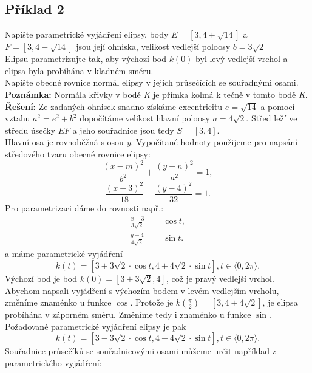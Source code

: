 		\subsection*{Příklad 2}
		Napište parametrické vyjádření elipsy, body $E=[3,4+\sqrt{14}]$ a $F=[3,4-\sqrt{14}]$ jsou její ohniska,
		velikost vedlejší poloosy $b=3\sqrt{2}$ \\
		Elipsu parametrizujte tak, aby výchozí bod $k(0)$ byl levý vedlejší vrchol a elipsa byla probíhána v kladném směru. \\
		Napište obecné rovnice normál elipsy v jejich průsečících se souřadnými osami. \\
		\textbf{Poznámka:} Normála křivky v bodě \textit{K} je přímka kolmá k tečně v tomto bodě \textit{K}. \\[10pt]
		\textbf{Řešení:} Ze zadaných ohnisek snadno získáme excentricitu $e=\sqrt{14}$ a pomocí vztahu $a^2=e^2+b^2$
		dopočítáme velikost hlavní poloosy $a=4\sqrt{2}$. Střed leží ve středu úsečky $EF$ a jeho souřadnice jsou tedy $S=[3,4]$.\\
		Hlavní osa je rovnoběžná s osou \textit{y}. Vypočítané hodnoty použijeme
		pro napsání středového tvaru obecné rovnice elipsy:
		$$\frac{(x-m)^2}{b^2}+\frac{(y-n)^2}{a^2}=1,$$
		$$\frac{(x-3)^2}{18}+\frac{(y-4)^2}{32}=1.$$
		Pro parametrizaci dáme do rovnosti např.:
		\begin{align*}
			\frac{x-3}{3\sqrt{2}} & = \cos{t}, \\
			\frac{y-4}{4\sqrt{2}} & = \sin{t}. 
		\end{align*}
		a máme parametrické vyjádření
		$$k(t) = [3+3\sqrt{2} \cdot \cos{t}, 4+4\sqrt{2} \cdot \sin{t}], t\in\langle0,2\pi\rangle.$$
		Výchozí bod je bod $k(0) = [3+3\sqrt{2},4]$, což je pravý vedlejší vrchol. Abychom napsali vyjádření s výchozím bodem v
		levém vedlejším vrcholu, změníme znaménko u funkce $\cos$. Protože je $k\left(\frac{\pi}{2}\right)=[3,4+4\sqrt{2}]$, je elipsa probíhána v záporném směru. Změníme tedy i znaménko u funkce $\sin$. \\ Požadované parametrické vyjádření elipsy je pak
		$$k(t) = [3-3\sqrt{2} \cdot \cos{t}, 4-4\sqrt{2} \cdot \sin{t}], t\in\langle0,2\pi\rangle.$$
		Souřadnice průsečíků se souřadnicovými osami
		můžeme určit například z parametrického vyjádření:
		\clearpage
